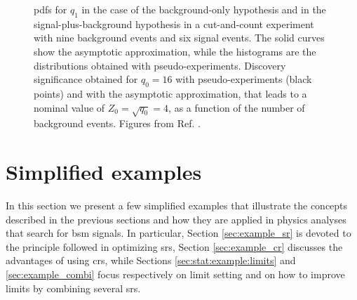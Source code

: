 \begin{figure}[h]
\centering 
{}
\caption{
 \glspl{pdf} for $q_1$ in the case of the background-only hypothesis and in the signal-plus-background hypothesis
in a cut-and-count experiment with nine background events and six signal events.
The solid curves show the asymptotic approximation, while the histograms are the distributions obtained with pseudo-experiments. 
 Discovery significance obtained for $q_0=16$ with pseudo-experiments (black points) and with the asymptotic approximation, that leads to a nominal value of $Z_0 = \sqrt{q_0} =4$, as a function of the number of background events. 
Figures from Ref. \cite{Cowan2011}.
}
\label{fig:stat:interp}
\end{figure}



\section{Simplified examples}
\label{sec:stat:examples}

In this section we present a few simplified examples that illustrate the concepts described in the previous sections and how they are applied in physics analyses that search for \gls{bsm} signals.
In particular, Section \ref{sec:example_sr} is devoted to the principle followed in optimizing \glspl{sr}, Section \ref{sec:example_cr} discusses the  advantages of using \glspl{cr},
while Sections \ref{sec:stat:example:limits} and \ref{sec:example_combi} focus respectively on limit setting and on how to improve limits by combining several \glspl{sr}.

